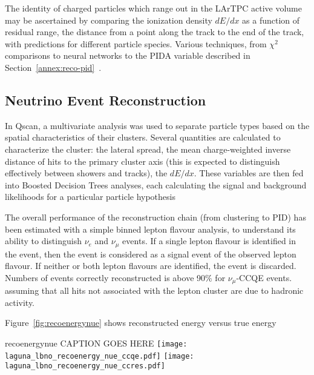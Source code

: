 The identity of charged particles which range out in the LArTPC active
volume may be ascertained by comparing the ionization density $dE/dx$ as a function
of residual range, the distance from a point along the track to the end of the
track, with predictions for different particle species.  Various techniques,
from $\chi^2$ comparisons to neural networks to the PIDA variable described
in Section~\ref{annex:reco-pid}~\cite{Acciarri:2013met}.
 

\subsection{Neutrino Event Reconstruction}

In Qscan, a multivariate analysis was used to separate particle types based on the spatial characteristics of their clusters.
Several quantities are calculated to 
characterize the cluster: the lateral spread, the mean charge-weighted inverse distance of hits to the primary cluster axis
(this is expected to distinguish effectively between showers and tracks), the $dE/dx$.
These variables are then fed into Boosted Decision Trees analyses, 
each calculating the signal and background likelihoods for a particular particle hypothesis

The overall performance of the reconstruction chain (from clustering to PID) has been estimated with a simple binned lepton flavour analysis, 
to understand its ability to distinguish $\nu_{e}$ and $\nu_{\mu}$ events.
If a single lepton flavour is identified in the event, then the event is considered as a signal event of the observed lepton flavour. 
If neither or both lepton flavours are identified, the event is discarded.
Numbers of events correctly reconstructed is above 90$\%$ for $\nu_{\mu}$-CCQE events.
assuming that all hits not associated with the lepton cluster are due to hadronic activity.


Figure~\ref{fig:recoenergynue} shows reconstructed energy versus true energy

\begin{cdrfigure}{recoenergynue}
{CAPTION GOES HERE}
\texttt{[image: laguna\_lbno\_recoenergy\_nue\_ccqe.pdf]}
\texttt{[image: laguna\_lbno\_recoenergy\_nue\_ccres.pdf]}
\end{cdrfigure}




